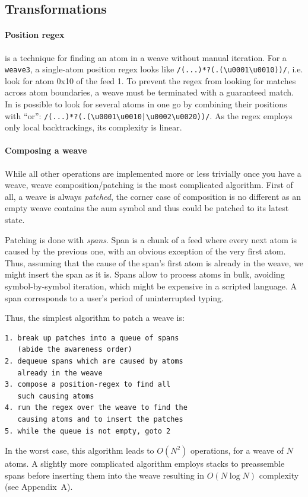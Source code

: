 \documentclass{acm_proc_article-sp}
\begin{document}
\subsection {Transformations}


\paragraph{Position regex} is a technique for finding an atom in a weave without manual iteration. For a {\tt weave3}, a single-atom position regex looks like \verb+/(...)*?(.(\u0001\u0010))/+, i.e. look for atom 0x10 of the feed 1. To prevent the regex from looking for matches across atom boundaries, a weave must be terminated with a guaranteed match. In is possible to look for several atoms in one go by combining their positions with ``or'': \verb+/(...)*?(.(\u0001\u0010|\u0002\u0020))/+. As the regex employs only local backtrackings, its complexity is linear.

\paragraph{Composing a weave}

While all other operations are implemented more or less trivially once you have a weave, weave composition/patching is the most complicated algorithm. First of all, a weave is always \emph{patched}, the corner case of composition is no different as an empty weave contains the aum symbol and thus could be patched to its latest state.

Patching is done with \emph{spans}. Span is a chunk of a feed where every next atom is caused by the previous one, with an obvious exception of the very first atom. Thus, assuming that the cause of the span's first atom is already in the weave, we might insert the span as it is.
Spans allow to process atoms in bulk, avoiding symbol-by-symbol iteration, which might be expensive in a scripted language. A span corresponds to a user's period of uninterrupted typing.

Thus, the  simplest algorithm to patch a weave is:
\begin{verbatim}
1. break up patches into a queue of spans
   (abide the awareness order)
2. dequeue spans which are caused by atoms
   already in the weave
3. compose a position-regex to find all
   such causing atoms
4. run the regex over the weave to find the
   causing atoms and to insert the patches
5. while the queue is not empty, goto 2
\end{verbatim}
In the worst case, this algorithm leads to $O(N^{2})$ operations, for a weave of $N$ atoms.
A slightly more complicated algorithm employs stacks to preassemble spans before inserting them into the weave resulting in $O(N\log N)$ complexity (see Appendix~A).
\end{document}

